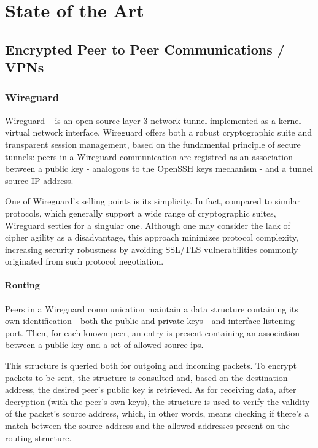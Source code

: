 \documentclass[11pt,twoside,a4paper]{report}
\begin{document}
\cleardoublepage


\chapter{State of the Art}
\label{chapter:sota}

\section{Encrypted Peer to Peer Communications / VPNs}

\subsection{Wireguard}

Wireguard ~\cite{donenfeld2017wireguard} is an open-source layer 3 network tunnel implemented as a kernel virtual network interface. Wireguard offers both a robust cryptographic suite and transparent session management, based on the fundamental principle of secure tunnels: peers in a Wireguard communication are registred as an association between a public key - analogous to the OpenSSH keys mechanism - and a tunnel source IP address.

One of Wireguard's selling points is its simplicity. In fact, compared to similar protocols, which generally support a wide range of cryptographic suites, Wireguard settles for a singular one. Although one may consider the lack of cipher agility as a disadvantage, this approach minimizes protocol complexity, increasing security robustness by avoiding SSL/TLS vulnerabilities commonly originated from such protocol negotiation.

\subsubsection{Routing}

Peers in a Wireguard communication maintain a data structure containing its own identification - both the public and private keys - and interface listening port. Then, for each known peer, an entry is present containing an association between a public key and a set of allowed source ips.

This structure is queried both for outgoing and incoming packets. To encrypt packets to be sent, the structure is consulted and, based on the destination address, the desired peer's public key is retrieved. As for receiving data, after decryption (with the peer's own keys), the structure is used to verify the validity of the packet's source address, which, in other words, means checking if there's a match between the source address and the allowed addresses present on the routing structure.
\end{document}
